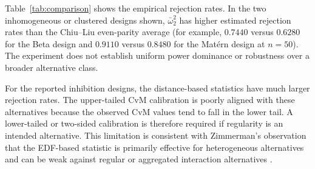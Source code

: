 \documentclass[pdflatex]{sn-jnl}
\theoremstyle{thmstyleone}
\theoremstyle{thmstyletwo}
\theoremstyle{thmstylethree}
\begin{document}
Table~\ref{tab:comparison} shows the empirical rejection rates. In the two inhomogeneous or clustered designs shown, $\bar\omega^2_2$ has higher estimated rejection rates than the Chiu--Liu even-parity average (for example, $0.7440$ versus $0.6280$ for the Beta design and $0.9110$ versus $0.8480$ for the Mat\'ern design at $n=50$). The experiment does not establish uniform power dominance or robustness over a broader alternative class.

For the reported inhibition designs, the distance-based statistics have much larger rejection rates. The upper-tailed CvM calibration is poorly aligned with these alternatives because the observed CvM values tend to fall in the lower tail. A lower-tailed or two-sided calibration is therefore required if regularity is an intended alternative. This limitation is consistent with Zimmerman's observation that the EDF-based statistic is primarily effective for heterogeneous alternatives and can be weak against regular or aggregated interaction alternatives \cite{Zimmerman1993}.
\end{document}
